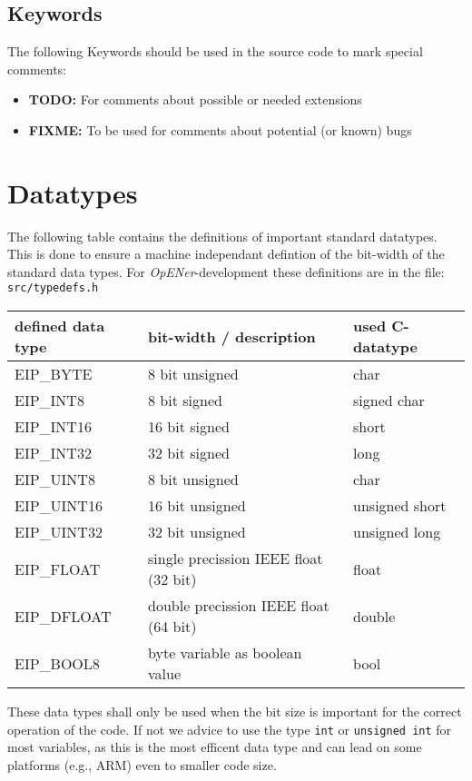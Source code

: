 \documentclass[final,a4paper,10pt, oneside]{article}
\begin{document}
\subsection{Keywords}
The following Keywords should be used in the source code to mark special comments:
\begin{itemize}
	\item \textbf{TODO:} For comments about possible or needed extensions
	\item \textbf{FIXME:} To be used for comments about potential (or known) bugs
\end{itemize}

\section{Datatypes}
The following table contains the definitions of important standard datatypes. This is done to ensure a machine independant defintion of the bit-width of the standard data types. For \emph{OpENer}-development these definitions are in the file: \verb|src/typedefs.h|

\begin{table}[h]
	\centering
		\begin{tabular}{lll}
			defined data type	& bit-width / description & used C-datatype \\
			\hline
			EIP\_BYTE	&	8 bit unsigned	&   char\\
			EIP\_INT8	&	8 bit signed	&	signed char	 \\
			EIP\_INT16	&	16 bit signed	&	short	 \\
			EIP\_INT32	&	32 bit signed	&	long	 \\
			EIP\_UINT8	&	8 bit unsigned	&	char	 \\
			EIP\_UINT16	&	16 bit unsigned	&	unsigned short	 \\
			EIP\_UINT32	&	32 bit unsigned	&	unsigned long	 \\
			EIP\_FLOAT	&	single precission IEEE float (32 bit)&	float	 \\
			EIP\_DFLOAT	&	double precission IEEE float (64 bit) &	double	\\
			EIP\_BOOL8	&	byte variable as boolean value	&	bool	 \\
		\end{tabular}
\end{table}

These data types shall only be used when the bit size is important for the correct operation of the code. If not we advice to use the type \verb|int| or \verb|unsigned int| for most variables, as this is the most efficent data type and can lead on some platforms (e.g., ARM) even to smaller code size.
\end{document}

